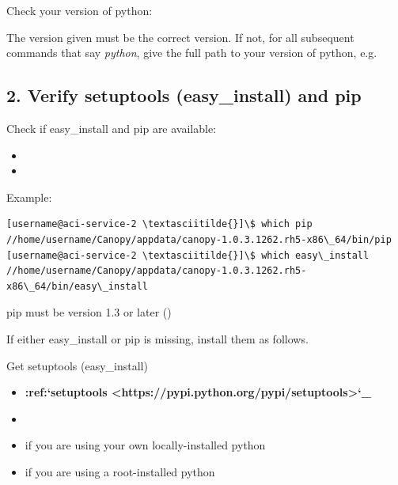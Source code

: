 \documentclass[letterpaper,10pt,english]{sphinxmanual}
\begin{document}
Check your version of python: 

The version given must be the correct version. If not, for all subsequent commands that say \emph{python}, give the full path to your version of python, e.g. 


\subsection{2. Verify setuptools (easy\_install) and pip}
\label{1_0_installation:verify-setuptools-easy-install-and-pip}
Check if easy\_install and pip are available:
\begin{itemize}
\item {} 

\item {} 

\end{itemize}

Example:

\begin{Verbatim}[commandchars=\\\{\}]
[username@aci-service-2 \textasciitilde{}]\$ which pip
//home/username/Canopy/appdata/canopy-1.0.3.1262.rh5-x86\_64/bin/pip
[username@aci-service-2 \textasciitilde{}]\$ which easy\_install
//home/username/Canopy/appdata/canopy-1.0.3.1262.rh5-x86\_64/bin/easy\_install
\end{Verbatim}

pip must be version 1.3 or later ()

If either easy\_install or pip is missing, install them as follows.

Get setuptools (easy\_install)
\begin{itemize}
\item {} 
{\color{red}\bfseries{}:ref:{}`setuptools \textless{}https://pypi.python.org/pypi/setuptools\textgreater{}{}`\_}

\item {} 

\item {} 
 if you are using your own locally-installed python

\item {} 
 if you are using a root-installed python

\end{itemize}
\end{document}
